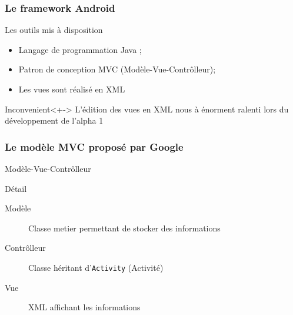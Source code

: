 \documentclass{beamer}
\def\android{Android\texttrademark}
\begin{document}
\begin{frame}
\frametitle{Le framework \android{}}
\begin{block}{Les outils mis à disposition}
  \begin{itemize}
    \item<+-> Langage de programmation Java ;
    \item<+-> Patron de conception MVC (Modèle-Vue-Contrôlleur);
    \item<+-> Les vues sont réalisé en XML
  \end{itemize}
\end{block}
\begin{alertblock}{Inconvenient}<+->
  L'édition des vues en XML nous à énorment ralenti lors du développement de l'alpha 1
\end{alertblock}
\end{frame}

\begin{frame}
\frametitle{Le modèle MVC proposé par Google}
\begin{block}{Modèle-Vue-Contrôlleur}
  \centering
\end{block}
\begin{block}{Détail}
\begin{description}
  \item[Modèle] Classe metier permettant de stocker des informations
  \item[Contrôlleur] Classe héritant d'\verb!Activity! (Activité)
  \item[Vue] XML affichant les informations
\end{description}
\end{block}
\end{frame}
\end{document}
